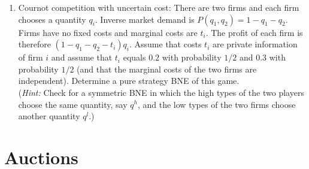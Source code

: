 \documentclass[a4paper,12pt]{article}
\begin{document}
\begin{enumerate}[resume]
\begin{enumerate}
  \end{enumerate}
 \item Cournot competition with uncertain cost: There are two firms and each firm chooses a quantity $q_i$. Inverse market demand is $P(q_1,q_2)=1-q_1-q_2$. Firms have no fixed costs and marginal costs are $t_i$. The profit of each firm is therefore $(1-q_1-q_2-t_i)q_i$. Assume that costs $t_i$ are private information of firm $i$ and assume that $t_i$ equals $0.2$ with probability $1/2$ and $0.3$ with probability $1/2$ (and that the marginal costs of the two firms are independent). Determine a pure strategy BNE of this game.\\
  (\emph{Hint: }Check for a symmetric BNE in which the high types of the two players choose the same quantity, say $q^h$, and the low types of the two firms choose another quantity $q^l$.)
\end{enumerate}

\section{Auctions}
\label{sec:auctions}
\end{document}
